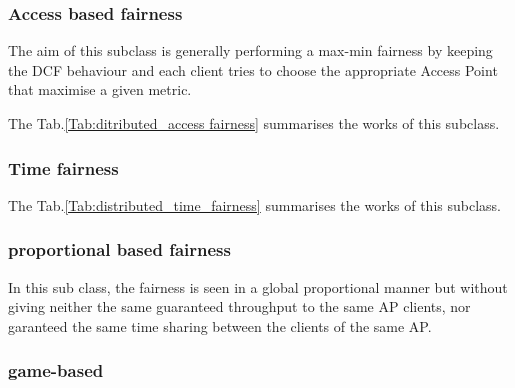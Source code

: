 \documentclass[journal,transmag]{IEEEtran}
\begin{document}
\subsubsection{Access based fairness}
The aim of this subclass is generally performing a max-min fairness by keeping the DCF behaviour and each client tries to choose the appropriate Access Point that maximise a given metric.

The Tab.\ref{Tab:ditributed_access fairness} summarises the works of this subclass.



\subsubsection{Time fairness}
The Tab.\ref{Tab:distributed_time_fairness} summarises the works of this subclass.





\subsubsection{proportional based fairness} In this sub class, the fairness is seen in a global  proportional manner but without giving neither the same guaranteed throughput to the same AP clients, nor garanteed the same time sharing between the clients of the same AP. \\




\subsubsection{game-based}
\end{document}
